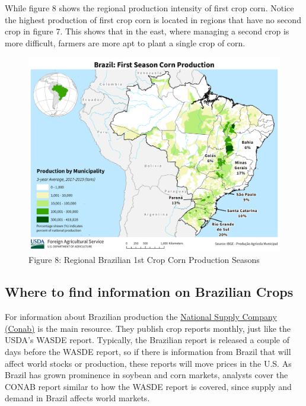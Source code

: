 \documentclass[
  letterpaper,
  DIV=11,
  numbers=noendperiod]{scrreprt}
\begin{document}
While figure 8 shows the regional production intensity of first crop
corn. Notice the highest production of first crop corn is located in
regions that have no second crop in figure 7. This shows that in the
east, where managing a second crop is more difficult, farmers are more
apt to plant a single crop of corn.

\begin{figure}

{\centering \includegraphics{assets/Brazil_FirstSeason_Corn.png}

}

\caption{Figure 8: Regional Brazilian 1st Crop Corn Production Seasons}

\end{figure}

\hypertarget{where-to-find-information-on-brazilian-crops}{%
\subsection{Where to find information on Brazilian
Crops}\label{where-to-find-information-on-brazilian-crops}}

For information about Brazilian production the
\href{http://www.conab.gov.br/index.php}{National Supply Company
(Conab)} is the main resource. They publish crop reports monthly, just
like the USDA's WASDE report. Typically, the Brazilian report is
released a couple of days before the WASDE report, so if there is
information from Brazil that will affect world stocks or production,
these reports will move prices in the U.S. As Brazil has grown
prominence in soybean and corn markets, analysts cover the CONAB report
similar to how the WASDE report is covered, since supply and demand in
Brazil affects world markets.
\end{document}
